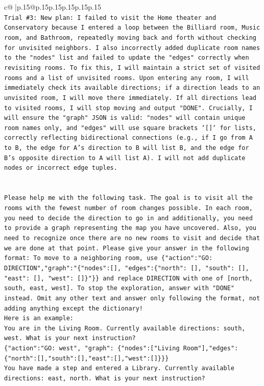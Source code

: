 \documentclass{article}
\begin{document}
{\begin{supertabular}{c@{$\;$}|p{.15\linewidth}@{}p{.15\linewidth}p{.15\linewidth}p{.15\linewidth}p{.15\linewidth}p{.15\linewidth}}
{{{\\ 
\texttt{Trial \#3: New plan: I failed to visit the Home theater and Conservatory because I entered a loop between the Billiard room, Music room, and Bathroom, repeatedly moving back and forth without checking for unvisited neighbors. I also incorrectly added duplicate room names to the "nodes" list and failed to update the "edges" correctly when revisiting rooms. To fix this, I will maintain a strict set of visited rooms and a list of unvisited rooms. Upon entering any room, I will immediately check its available directions; if a direction leads to an unvisited room, I will move there immediately. If all directions lead to visited rooms, I will stop moving and output "DONE". Crucially, I will ensure the "graph" JSON is valid: "nodes" will contain unique room names only, and "edges" will use square brackets `{[}{]}` for lists, correctly reflecting bidirectional connections (e.g., if I go from A to B, the edge for A's direction to B will list B, and the edge for B's opposite direction to A will list A). I will not add duplicate nodes or incorrect edge tuples.} \\
\\ 
\\ 
\texttt{Please help me with the following task. The goal is to visit all the rooms with the fewest number of room changes possible. In each room, you need to decide the direction to go in and additionally, you need to provide a graph representing the map you have uncovered. Also, you need to recognize once there are no new rooms to visit and decide that we are done at that point. Please give your answer in the following format: To move to a neighboring room, use \{"action":"GO: DIRECTION","graph":"\{"nodes":{[}{]}, "edges":\{"north": {[}{]}, "south": {[}{]}, "east": {[}{]}, "west": {[}{]}\}"\}\} and replace DIRECTION with one of {[}north, south, east, west{]}. To stop the exploration, answer with "DONE" instead. Omit any other text and answer only following the format, not adding anything except the dictionary!} \\
\texttt{Here is an example: } \\
\texttt{You are in the Living Room. Currently available directions: south, west. What is your next instruction?} \\
\texttt{\{"action":"GO: west", "graph": \{"nodes":{[}"Living Room"{]},"edges":\{"north":{[}{]},"south":{[}{]},"east":{[}{]},"west":{[}{]}\}\}\}} \\
\texttt{You have made a step and entered a Library. Currently available directions: east, north. What is your next instruction?} \\
}}}
\end{supertabular}}
\end{document}
